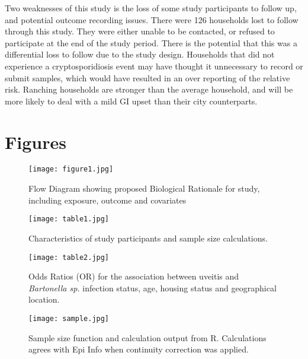 \documentclass[12pt]{article}
\begin{document}
		Two weaknesses of this study is the loss of some study participants to follow up, and potential outcome recording issues.
		There were 126 households lost to follow through this study. They were either unable to be contacted, or refused to participate at the end of the study period. There is the potential that this was a differential loss to follow due to the study design. 
		Households that did not experience a cryptosporidiosis event may have thought it unnecessary to record or submit samples, which would have resulted in an over reporting of the relative risk.
		Ranching households are stronger than the average household, and will be more likely to deal with a mild GI upset than their city counterparts. 
		\clearpage
		
	\section{Figures}

\begin{figure*}[h!]
	\centering
	\texttt{[image: figure1.jpg]}
	\caption{Flow Diagram showing proposed Biological Rationale for study, including exposure, outcome and covariates }
	\label{fig:1}
\end{figure*}

\begin{figure*}[h!]
	\centering
	\texttt{[image: table1.jpg]}
	\caption{Characteristics of study participants and sample size calculations.}
	\label{tab:1}
\end{figure*}
 
\begin{figure*}[h!]
	\centering
	\texttt{[image: table2.jpg]}
	\caption{Odds Ratios (OR) for the association between uveitis and \emph{Bartonella sp.} infection status, age, housing status and geographical location.}
	\label{tab:2}
\end{figure*}

\begin{figure*}[h!]
	\centering
	\texttt{[image: sample.jpg]}
	\caption{Sample size function and calculation output from R. Calculations agrees with Epi Info when continuity correction was applied.}
	\label{fig:samplesizecalc}
\end{figure*}

\clearpage


\end{document}
